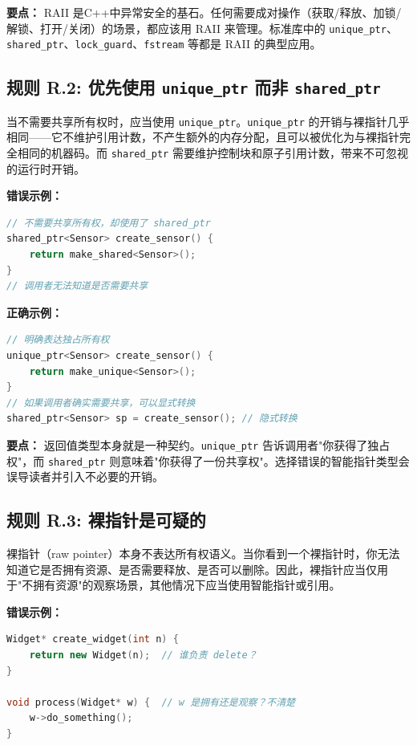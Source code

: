 \textbf{要点：} RAII 是C++中异常安全的基石。任何需要成对操作（获取/释放、加锁/解锁、打开/关闭）的场景，都应该用 RAII 来管理。标准库中的 \texttt{unique\_ptr}、\texttt{shared\_ptr}、\texttt{lock\_guard}、\texttt{fstream} 等都是 RAII 的典型应用。

\subsection*{\textbf{规则 R.2:} 优先使用 \texttt{unique\_ptr} 而非 \texttt{shared\_ptr}}

当不需要共享所有权时，应当使用 \texttt{unique\_ptr}。\texttt{unique\_ptr} 的开销与裸指针几乎相同——它不维护引用计数，不产生额外的内存分配，且可以被优化为与裸指针完全相同的机器码。而 \texttt{shared\_ptr} 需要维护控制块和原子引用计数，带来不可忽视的运行时开销。

\textbf{错误示例：}

\begin{lstlisting}[language=C++]
// 不需要共享所有权，却使用了 shared_ptr
shared_ptr<Sensor> create_sensor() {
    return make_shared<Sensor>();
}
// 调用者无法知道是否需要共享
\end{lstlisting}

\textbf{正确示例：}

\begin{lstlisting}[language=C++]
// 明确表达独占所有权
unique_ptr<Sensor> create_sensor() {
    return make_unique<Sensor>();
}
// 如果调用者确实需要共享，可以显式转换
shared_ptr<Sensor> sp = create_sensor(); // 隐式转换
\end{lstlisting}

\textbf{要点：} 返回值类型本身就是一种契约。\texttt{unique\_ptr} 告诉调用者"你获得了独占权"，而 \texttt{shared\_ptr} 则意味着"你获得了一份共享权"。选择错误的智能指针类型会误导读者并引入不必要的开销。

\subsection*{\textbf{规则 R.3:} 裸指针是可疑的}

裸指针（raw pointer）本身不表达所有权语义。当你看到一个裸指针时，你无法知道它是否拥有资源、是否需要释放、是否可以删除。因此，裸指针应当仅用于"不拥有资源"的观察场景，其他情况下应当使用智能指针或引用。

\textbf{错误示例：}

\begin{lstlisting}[language=C++]
Widget* create_widget(int n) {
    return new Widget(n);  // 谁负责 delete？
}

void process(Widget* w) {  // w 是拥有还是观察？不清楚
    w->do_something();
}
\end{lstlisting}

